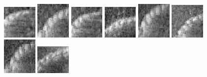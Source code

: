 \begin{figure}
    \includegraphics[width=0.15\textwidth]{chapters/images/dataset/all-class-images/chain/chain-145.jpg}
    \includegraphics[width=0.15\textwidth]{chapters/images/dataset/all-class-images/chain/chain-101.jpg}
    \includegraphics[width=0.15\textwidth]{chapters/images/dataset/all-class-images/chain/chain-142.jpg}    
    \includegraphics[width=0.15\textwidth]{chapters/images/dataset/all-class-images/chain/chain-175.jpg}
    \includegraphics[width=0.15\textwidth]{chapters/images/dataset/all-class-images/chain/chain-104.jpg}
    \includegraphics[width=0.15\textwidth]{chapters/images/dataset/all-class-images/chain/chain-84.jpg}
    \includegraphics[width=0.15\textwidth]{chapters/images/dataset/all-class-images/chain/chain-105.jpg}    
    \includegraphics[width=0.15\textwidth]{chapters/images/dataset/all-class-images/chain/chain-223.jpg}

\end{figure}
